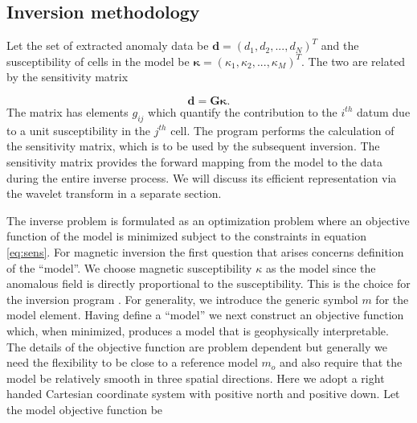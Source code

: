 \subsection{Inversion methodology}
\label{inversionmethodology}
Let the set of extracted anomaly data be $\mathbf{d} = (d_1,d_2,...,d_N)^T$ and the susceptibility of cells in the model be $\bm{\kappa} = (\kappa_1,\kappa_2,...,\kappa_M)^T$. The two are related by the sensitivity matrix

\begin{equation}
\label{eq:sens}
\mathbf{d}=\mathbf{G}\bm{\kappa}.
\end{equation}
%
The matrix has elements $g_{ij}$ which quantify the contribution to the $i^{th}$ datum due to a unit susceptibility in the $j^{th}$ cell. The program  performs the calculation of the sensitivity matrix, which is to be used by the subsequent inversion. The sensitivity matrix provides the forward mapping from the model to the data during the entire inverse process. We will discuss its efficient representation via the wavelet transform in a separate section.

The inverse problem is formulated as an optimization problem where an objective function of the model is minimized subject to the constraints in equation \ref{eq:sens}. For magnetic inversion the first question that arises concerns definition of the ``model''. We choose magnetic susceptibility $\kappa$ as the model since the anomalous field is directly proportional to the susceptibility. This is the choice for the inversion program . For generality, we introduce the generic symbol $m$ for the model element. Having define a ``model'' we next construct an objective function which, when minimized, produces a model that is geophysically interpretable. The details of the objective function are problem dependent but generally we need the flexibility to be close to a reference model $m_o$ and also require that the model be relatively smooth in three spatial directions. Here we adopt a right handed Cartesian coordinate system with positive north and positive down. Let the model objective function be

